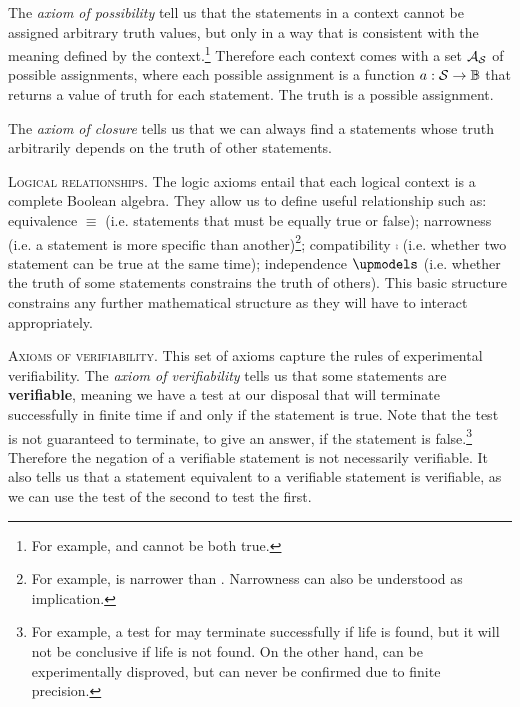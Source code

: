 \documentclass[10pt,twocolumn, nofootinbib]{revtex4-1}
\newcommand\partitle[1]{\textsc{#1}.}
\begin{document}
The \emph{axiom of possibility} tell us that the statements in a context cannot be assigned arbitrary truth values, but only in a way that is consistent with the meaning defined by the context.\footnote{For example,  and  cannot be both true.} Therefore each context comes with a set $\mathcal{A}_{\mathcal{S}}$ of possible assignments, where each possible assignment is a function $a : \mathcal{S} \to \mathbb{B}$ that returns a value of truth for each statement. The truth is a possible assignment.

The \emph{axiom of closure} tells us that we can always find a statements whose truth arbitrarily depends on the truth of other statements.

\partitle{Logical relationships} The logic axioms entail that each logical context is a complete Boolean algebra. They allow us to define useful relationship such as: equivalence $\equiv$ (i.e. statements that must be equally true or false); narrowness (i.e. a statement is more specific than another)\footnote{For example,  is narrower than . Narrowness can also be understood as implication.}; compatibility $\comp$ (i.e. whether two statement can be true at the same time); independence $\indep$ (i.e. whether the truth of some statements constrains the truth of others). This basic structure constrains any further mathematical structure as they will have to interact appropriately.

\partitle{Axioms of verifiability} This set of axioms capture the rules of experimental verifiability. The \emph{axiom of verifiability} tells us that some statements are \textbf{verifiable}, meaning we have a test at our disposal that will terminate successfully in finite time if and only if the statement is true. Note that the test is not guaranteed to terminate, to give an answer, if the statement is false.\footnote{For example, a test for  may terminate successfully if life is found, but it will not be conclusive if life is not found. On the other hand,  can be experimentally disproved, but can never be confirmed due to finite precision.} Therefore the negation of a verifiable statement is not necessarily verifiable. It also tells us that a statement equivalent to a verifiable statement is verifiable, as we can use the test of the second to test the first.
\end{document}

